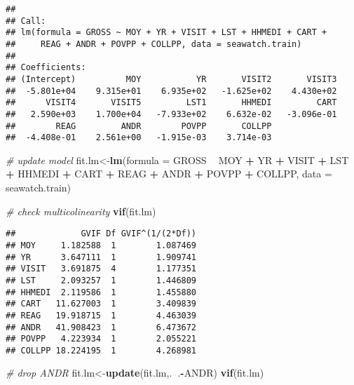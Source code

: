 \documentclass[]{article}
\newenvironment{Shaded}{\begin{snugshade}}{\end{snugshade}}
\newcommand{\KeywordTok}[1]{\textcolor[rgb]{0.13,0.29,0.53}{\textbf{#1}}}
\newcommand{\DataTypeTok}[1]{\textcolor[rgb]{0.13,0.29,0.53}{#1}}
\newcommand{\StringTok}[1]{\textcolor[rgb]{0.31,0.60,0.02}{#1}}
\newcommand{\CommentTok}[1]{\textcolor[rgb]{0.56,0.35,0.01}{\textit{#1}}}
\newcommand{\OperatorTok}[1]{\textcolor[rgb]{0.81,0.36,0.00}{\textbf{#1}}}
\newcommand{\NormalTok}[1]{#1}
\begin{document}
\begin{verbatim}
## 
## Call:
## lm(formula = GROSS ~ MOY + YR + VISIT + LST + HHMEDI + CART + 
##     REAG + ANDR + POVPP + COLLPP, data = seawatch.train)
## 
## Coefficients:
## (Intercept)          MOY           YR       VISIT2       VISIT3  
##  -5.801e+04    9.315e+01    6.935e+02   -1.625e+02    4.430e+02  
##      VISIT4       VISIT5         LST1       HHMEDI         CART  
##   2.590e+03    1.700e+04   -7.933e+02    6.632e-02   -3.096e-01  
##        REAG         ANDR        POVPP       COLLPP  
##  -4.408e-01    2.561e+00   -1.915e-03    3.714e-03
\end{verbatim}

\begin{Shaded}
\begin{Highlighting}[]
\CommentTok{# update model}
\NormalTok{fit.lm<-}\KeywordTok{lm}\NormalTok{(}\DataTypeTok{formula =}\NormalTok{ GROSS }\OperatorTok{~}\StringTok{ }\NormalTok{MOY }\OperatorTok{+}\StringTok{ }\NormalTok{YR }\OperatorTok{+}\StringTok{ }\NormalTok{VISIT }\OperatorTok{+}\StringTok{ }\NormalTok{LST }\OperatorTok{+}\StringTok{ }\NormalTok{HHMEDI }\OperatorTok{+}\StringTok{ }\NormalTok{CART }\OperatorTok{+}\StringTok{ }
\StringTok{    }\NormalTok{REAG }\OperatorTok{+}\StringTok{ }\NormalTok{ANDR }\OperatorTok{+}\StringTok{ }\NormalTok{POVPP }\OperatorTok{+}\StringTok{ }\NormalTok{COLLPP, }\DataTypeTok{data =}\NormalTok{ seawatch.train)}

\CommentTok{# check multicolinearity}
\KeywordTok{vif}\NormalTok{(fit.lm)}
\end{Highlighting}
\end{Shaded}

\begin{verbatim}
##             GVIF Df GVIF^(1/(2*Df))
## MOY     1.182588  1        1.087469
## YR      3.647111  1        1.909741
## VISIT   3.691875  4        1.177351
## LST     2.093257  1        1.446809
## HHMEDI  2.119586  1        1.455880
## CART   11.627003  1        3.409839
## REAG   19.918715  1        4.463039
## ANDR   41.908423  1        6.473672
## POVPP   4.223934  1        2.055221
## COLLPP 18.224195  1        4.268981
\end{verbatim}

\begin{Shaded}
\begin{Highlighting}[]
\CommentTok{# drop ANDR}
\NormalTok{fit.lm<-}\KeywordTok{update}\NormalTok{(fit.lm,.}\OperatorTok{~}\NormalTok{.}\OperatorTok{-}\NormalTok{ANDR)}
\KeywordTok{vif}\NormalTok{(fit.lm)}
\end{Highlighting}
\end{Shaded}
\end{document}
